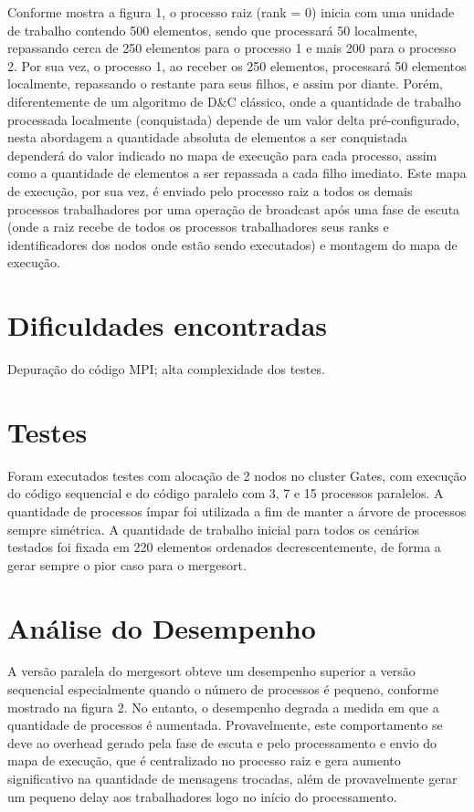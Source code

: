 \documentclass{article}
\begin{document}
\begin{multicols*}{2}
Conforme mostra a figura 1, o processo raiz (rank = 0) inicia com
uma unidade de trabalho contendo 500 elementos, sendo que
processará 50 localmente, repassando cerca de 250 elementos para
o processo 1 e mais 200 para o processo 2. Por sua vez, o processo 1,
ao receber os 250 elementos, processará 50 elementos localmente,
repassando o restante para seus filhos, e assim por diante. Porém,
diferentemente de um algoritmo de D\&C clássico, onde a
quantidade de trabalho processada localmente (conquistada)
depende de um valor delta pré-configurado, nesta abordagem a
quantidade absoluta de elementos a ser conquistada dependerá do
valor indicado no mapa de execução para cada processo, assim
como a quantidade de elementos a ser repassada a cada filho
imediato. Este mapa de execução, por sua vez, é enviado pelo
processo raiz a todos os demais processos trabalhadores por uma
operação de broadcast após uma fase de escuta (onde a raiz recebe
de todos os processos trabalhadores seus ranks e identificadores
dos nodos onde estão sendo executados) e montagem do mapa de
execução. 

\section{Dificuldades encontradas}
Depuração do código MPI; alta complexidade dos testes.

\section{Testes}
Foram executados testes com alocação de 2 nodos no cluster Gates,
com execução do código sequencial e do código paralelo com 3, 7 e
15 processos paralelos. A quantidade de processos ímpar foi
utilizada a fim de manter a árvore de processos sempre simétrica. A
quantidade de trabalho inicial para todos os cenários testados foi
fixada em 220 elementos ordenados decrescentemente, de forma a
gerar sempre o pior caso para o mergesort.

\section{Análise do Desempenho}
A versão paralela do mergesort obteve um desempenho superior a
versão sequencial especialmente quando o número de processos é
pequeno, conforme mostrado na figura 2. No entanto, o
desempenho degrada a medida em que a quantidade de processos é
aumentada. Provavelmente, este comportamento se deve ao
overhead gerado pela fase de escuta e pelo processamento e envio
do mapa de execução, que é centralizado no processo raiz e gera
aumento significativo na quantidade de mensagens trocadas, além
de provavelmente gerar um pequeno delay aos trabalhadores logo
no início do processamento.


\end{multicols*}
\end{document}
